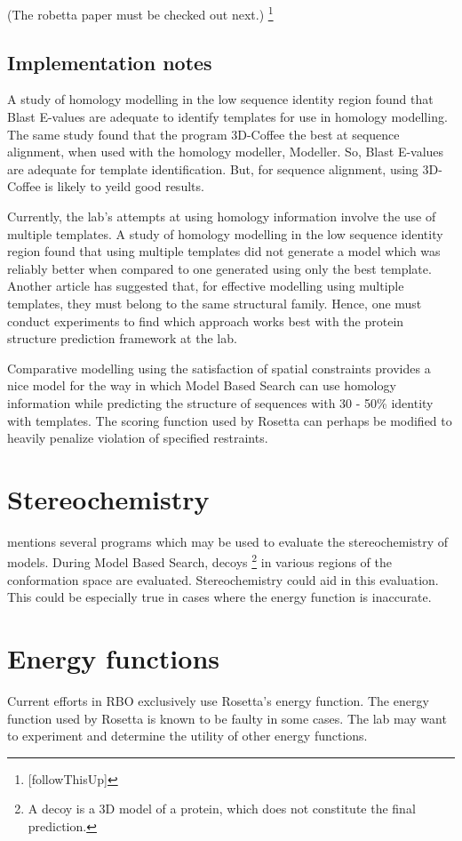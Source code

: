 \documentclass[10pt]{report}
\begin{document}
(The robetta paper must be checked out next.) \footnote{[followThisUp]}

\subsection{Implementation notes}

A study of homology modelling in the low sequence identity region found that Blast E-values are adequate to identify templates for use in homology modelling. The same study found that the program 3D-Coffee the best at sequence alignment, when used with the homology modeller, Modeller.\cite{dalton07} So, Blast E-values are adequate for template identification. But, for sequence alignment, using 3D-Coffee is likely to yeild good results.

Currently, the lab's attempts at using homology information involve the use of multiple templates. A study of homology modelling in the low sequence identity region found that using multiple templates did not generate a model which was reliably better when compared to one generated using only the best template.\cite{dalton07} Another article has suggested that, for effective modelling using multiple templates, they must belong to the same structural family. \cite{bates01} Hence, one must conduct experiments to find which approach works best with the protein structure prediction framework at the lab.

Comparative modelling using the satisfaction of spatial constraints provides a nice model for the way in which Model Based Search can use homology information while predicting the structure of sequences with 30 - 50\% identity with templates. The scoring function used by Rosetta can perhaps be modified to heavily penalize violation of specified restraints.

\section{Stereochemistry}

\cite{marti-renom2000com} mentions several programs which may be used to evaluate the stereochemistry of models. During Model Based Search, decoys \footnote{A decoy is a 3D model of a protein, which does not constitute the final prediction.} in various regions of the conformation space are evaluated. Stereochemistry could aid in this evaluation. This could be especially true in cases where the energy function is inaccurate.

\section{Energy functions}

Current efforts in RBO exclusively use Rosetta's energy function. The energy function used by Rosetta is known to be faulty in some cases. The lab may want to experiment and determine the utility of other energy functions.



\end{document}
